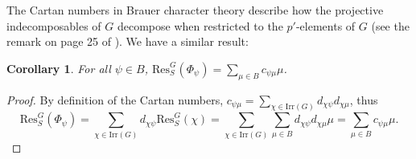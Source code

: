 \documentclass[12pt]{article}
\theoremstyle{plain}
\newtheorem{cor}[thm]{Corollary}
\theoremstyle{definition}
\begin{document}
The Cartan numbers in Brauer character theory describe how the projective indecomposables of $G$ decompose when restricted to the $p'$-elements of $G$ (see the remark on page 25 of \cite{navarro}). We have a similar result:

\begin{cor}\label{proj restriction} 
For all $\psi \in B$, $\displaystyle \mathrm{Res}^G_S(\Phi_{\psi}) = \sum_{\mu \in B} c_{\psi\mu}\mu$. 
\end{cor}
\begin{proof}
By definition of the Cartan numbers, $c_{\psi\mu} = \displaystyle\sum_{\chi \in \mathrm{Irr}(G)} d_{\chi\psi}d_{\chi\mu}$, thus
\[\text{Res}^G_S(\Phi_{\psi}) = \sum_{\chi \in \mathrm{Irr}(G)} d_{\chi\psi} \mathrm{Res}^G_S(\chi) = \sum_{\chi \in \mathrm{Irr}(G)}\sum_{\mu \in B} d_{\chi\psi}d_{\chi\mu}\mu = \sum_{\mu \in B} c_{\psi\mu}\mu.\]
\end{proof}
\end{document}
